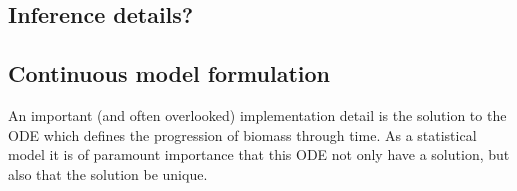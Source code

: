\documentclass[12pt]{article}
\begin{document}



\subsection{\color{blue} Inference details?}

%
\subsection{Continuous model formulation}

%

%



%
An important (and often overlooked) implementation detail is the solution to the
ODE which defines the progression of biomass through time. %
As a statistical model it is of paramount importance that this ODE not only have a
solution, but also that the solution be unique. %
\end{document}
